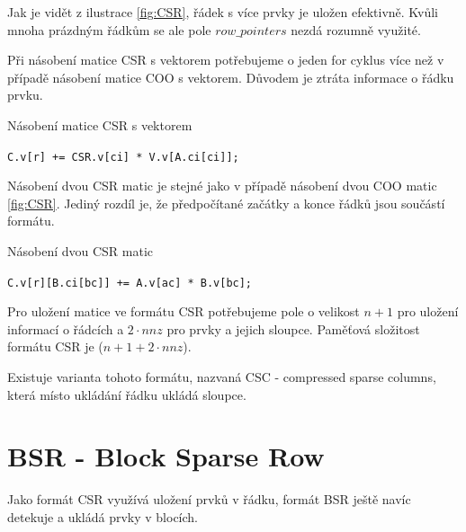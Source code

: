 Jak je vidět z ilustrace \ref{fig:CSR}, řádek s více prvky je uložen efektivně. Kvůli mnoha prázdným řádkům se ale pole $row\_pointers$ nezdá rozumně využité.

Při násobení matice CSR s vektorem potřebujeme o jeden for cyklus více než v případě násobení matice COO s vektorem. Důvodem je ztráta informace o řádku prvku.

\begin{algorithm}[htb]
	\caption{Násobení matice CSR s vektorem}\label{csr-mvm}
	\begin{algorithmic}[1]
				\State \texttt{C.v[r] += CSR.v[ci] * V.v[A.ci[ci]];}
			\EndFor
		\EndFor
		\EndProcedure
	\end{algorithmic}
\end{algorithm}

Násobení dvou CSR matic je stejné jako v případě násobení dvou COO matic \ref{fig:CSR}. Jediný rozdíl je, že předpočítané začátky a konce řádků jsou součástí formátu.

\label{alg:csr-mmm}
\begin{algorithm}[htb]
	\caption{Násobení dvou CSR matic}\label{csr-mmm}
	\begin{algorithmic}[1]
					\State \texttt{C.v[r][B.ci[bc]] += A.v[ac] * B.v[bc];}
				\EndFor
			\EndFor
		\EndFor
		\EndProcedure
	\end{algorithmic}
\end{algorithm}

Pro uložení matice ve formátu CSR potřebujeme pole o velikost $n + 1$ pro uložení informací o řádcích a $2 \cdot nnz$ pro prvky a jejich sloupce. Paměťová složitost formátu CSR je \bigO($ n+1 + 2 \cdot nnz $). 

Existuje varianta tohoto formátu, nazvaná CSC - compressed sparse columns, která místo ukládání řádku ukládá sloupce.

\section{BSR - Block Sparse Row}

Jako formát CSR využívá uložení prvků v řádku, formát BSR \cite{bsrscipy}\cite{bsrintel} ještě navíc detekuje a ukládá prvky v blocích.

